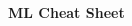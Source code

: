 \documentclass[11pt,a4paper,landscape]{article} %
\begin{document}
\raggedright
\footnotesize
\begin{multicols*}{5}

\setlength{\columnseprule}{0.25pt}
\setlength{\premulticols}{1pt}
\setlength{\postmulticols}{1pt}
\setlength{\multicolsep}{1pt}
\setlength{\columnsep}{2pt}

\begin{center}
     \small{\textbf{ML Cheat Sheet}} \\
\end{center}

\tiny



\end{multicols*}
\end{document}
